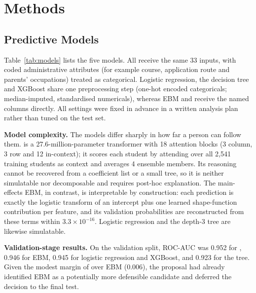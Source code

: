 \section{Methods}
\label{sec:methods}

\subsection{Predictive Models}

Table~\ref{tab:models} lists the five models. All receive the same 33 inputs, with coded
administrative attributes (for example course, application route and parents' occupations) treated
as categorical. Logistic regression, the decision tree and XGBoost share one preprocessing step
(one-hot encoded categoricals; median-imputed, standardised numericals), whereas EBM and \tabicl
receive the named columns directly. All settings were fixed in advance in a written analysis plan
rather than tuned on the test set.

\textbf{Model complexity.} The models differ sharply in how far a person can follow them. \tabicl
is a 27.6-million-parameter transformer with 18 attention blocks (3 column, 3 row and 12
in-context); it scores each student by attending over all 2,541 training students as context and
averages 4 ensemble members. Its reasoning cannot be recovered from a coefficient list or a small
tree, so it is neither simulatable nor decomposable and requires post-hoc explanation. The
main-effects EBM, in contrast, is interpretable by construction: each prediction is exactly the
logistic transform of an intercept plus one learned shape-function contribution per feature, and its
validation probabilities are reconstructed from these terms within $3.3\times10^{-16}$. Logistic
regression and the depth-3 tree are likewise simulatable.

\textbf{Validation-stage results.} On the validation split, ROC-AUC was 0.952 for \tabicl, 0.946
for EBM, 0.945 for logistic regression and XGBoost, and 0.923 for the tree. Given the modest margin
of \tabicl over EBM (0.006), the proposal had already identified EBM as a potentially more
defensible candidate and deferred the decision to the final test.

